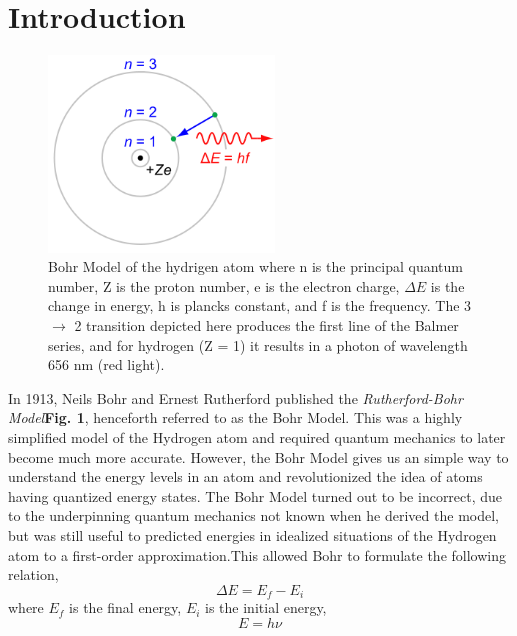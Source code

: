 \documentclass[%
 reprint,
 amsmath,amssymb,
 aps,
]{revtex4-1}
\begin{document}



\section{\label{sec:level1}Introduction}
\begin{figure}
\includegraphics[width = 6cm,keepaspectratio]{bohrmodel.png}
\caption{Bohr Model of the hydrigen atom where n is the principal quantum number, Z is the proton number, e is the electron charge, $\Delta E$ is the change in energy, h is plancks constant, and f is the frequency. The 3 $\rightarrow$ 2 transition depicted here produces 
the first line of the Balmer series, and for hydrogen (Z = 1) it results in a photon of wavelength 656 nm (red light).\cite{bohrmodel} }
\end{figure}

In 1913,  Neils Bohr and Ernest Rutherford published the \textit{Rutherford-Bohr Model}\cite{bohrmodel}\textbf{Fig. 1}, henceforth referred to as the Bohr Model. This was a highly simplified model of the Hydrogen atom and required quantum mechanics to later become much more accurate. However, the Bohr Model gives us an simple way to understand the energy levels in an atom and revolutionized the idea of atoms having quantized energy states. The Bohr Model \cite{bohrmodel} turned out to be incorrect, due to the underpinning quantum mechanics not known when he derived the model, but was still useful to predicted energies in idealized situations of the Hydrogen atom to a first-order approximation.This allowed Bohr to formulate the following relation,
\[ \Delta E = E_f - E_i \]
where $E_f$ is the final energy, $E_i$ is the initial energy,
\[ E = h\nu \]
\end{document}
